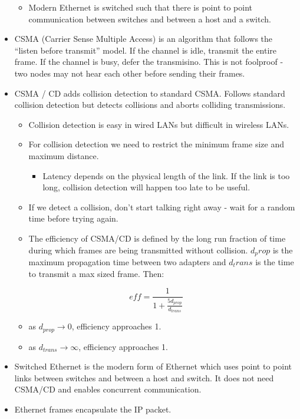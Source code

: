 \begin{itemize}
  \begin{itemize}
  \tightlist
  \item
    Modern Ethernet is switched such that there is point to point
    communication between switches and between a host and a switch.
  \end{itemize}
\item
  CSMA (Carrier Sense Multiple Access) is an algorithm that follows the
  ``listen before transmit'' model. If the channel is idle, transmit the
  entire frame. If the channel is busy, defer the transmisino. This is
  not foolproof - two nodes may not hear each other before sending their
  frames.
\item
  CSMA / CD adds collision detection to standard CSMA. Follows standard
  collision detection but detects collisions and aborts colliding
  transmissions.

  \begin{itemize}
  \tightlist
  \item
    Collision detection is easy in wired LANs but difficult in wireless
    LANs.
  \item
    For collision detection we need to restrict the minimum frame size
    and maximum distance.

    \begin{itemize}
    \tightlist
    \item
      Latency depends on the physical length of the link. If the link is
      too long, collision detection will happen too late to be useful.
    \end{itemize}
  \item
    If we detect a collision, don't start talking right away - wait for
    a random time before trying again.
  \item
    The efficiency of CSMA/CD is defined by the long run fraction of
    time during which frames are being transmitted without collision.
    \(d_prop\) is the maximum propagation time between two adapters and
    \(d_trans\) is the time to transmit a max sized frame. Then:
  \end{itemize}

  \[eff = \frac{1}{1 + \frac{5 d_{prop}}{d_{trans}}}\]

  \begin{itemize}
  \tightlist
  \item
    as \(d_{prop} \to 0\), efficiency approaches 1.
  \item
    as \(d_{trans} \to \infty\), efficiency approaches 1.
  \end{itemize}
\item
  Switched Ethernet is the modern form of Ethernet which uses point to
  point links between switches and between a host and switch. It does
  not need CSMA/CD and enables concurrent communication.
\item
  Ethernet frames encapsulate the IP packet.


\end{itemize}
